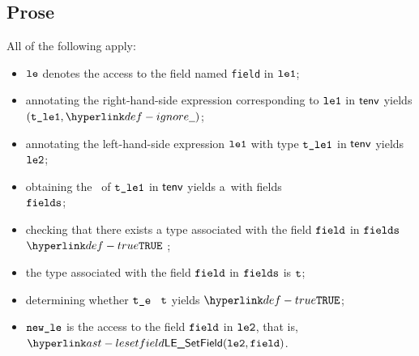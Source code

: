 \subsection{Prose}
All of the following apply:
\begin{itemize}
  \item $\texttt{le}$ denotes the access to the field named \texttt{field} in $\texttt{le1}$;
  \item annotating the right-hand-side expression corresponding to $\texttt{le1}$ in $\textsf{tenv}$ yields \\ $(\vtleone, \Ignore)$\ProseOrTypeError;
  \item annotating the left-hand-side expression  $\texttt{le1}$ with type $\texttt{t\_le1}$ in $\textsf{tenv}$ yields $\texttt{le2}$\ProseOrTypeError;
  \item obtaining the \structure\ of $\texttt{t\_le1}$ in $\textsf{tenv}$ yields a\structuredtype\ with fields \\
        $\texttt{fields}$\ProseOrTypeError;
  \item checking that there exists a type associated with the field $\texttt{field}$ in $\texttt{fields}$ $\True$ \ProseTerminateAs{\MissingField};
  \item the type associated with the field $\texttt{field}$ in $\texttt{fields}$ is $\texttt{t}$;
  \item determining whether $\texttt{t\_e}$ \typesatisfies\ $\texttt{t}$ yields $\True$\ProseOrTypeError;
  \item $\texttt{new\_le}$ is the access to the field $\texttt{field}$ in $\texttt{le2}$, that is, $\LESetField(\vletwo, \field)$.
\end{itemize}




